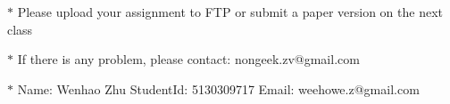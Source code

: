 \documentclass[12pt,a4paper]{article}
\theoremstyle{definition}
\numberwithin{equation}{section}
\numberwithin{figure}{section}
\begin{document}
\noindent{}
\begin{center}
\footnotesize{\color{red}$*$ Please upload your assignment to FTP or submit a paper version on the next class}

\footnotesize{\color{red}$*$ If there is any problem, please contact: nongeek.zv@gmail.com }

\footnotesize{\color{blue}$*$ Name: Wenhao Zhu \quad StudentId: 5130309717 \quad Email: weehowe.z@gmail.com}
\end{center}


\begin{enumerate}%


\end{enumerate}
\end{document}
